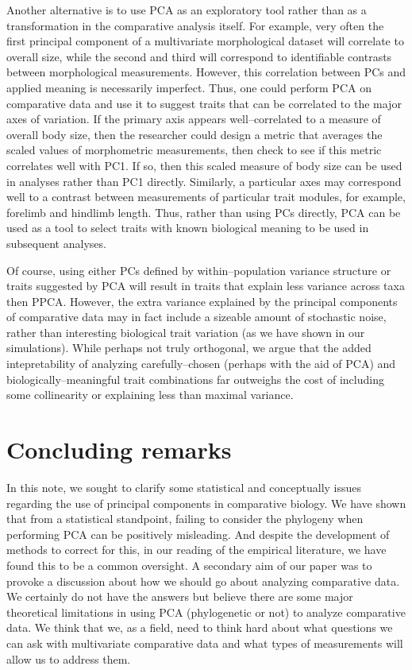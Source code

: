 \documentclass[a4paper,12pt]{article}
\begin{document}
Another alternative is to use PCA as an exploratory tool rather than as a transformation in the comparative analysis itself. For example, very often the first principal component of a multivariate morphological dataset will correlate to overall size, while the second and third will correspond to identifiable contrasts between morphological measurements. However, this correlation between PCs and applied meaning is necessarily imperfect. Thus, one could perform PCA on comparative data and use it to suggest traits that can be correlated to the major axes of variation. If the primary axis appears well--correlated to a measure of overall body size, then the researcher could design a metric that averages the scaled values of morphometric measurements, then check to see if this metric correlates well with PC1. If so, then this scaled measure of body size can be used in analyses rather than PC1 directly. Similarly, a particular axes may correspond well to a contrast between measurements of particular trait modules, for example, forelimb and hindlimb length. Thus, rather than using PCs directly, PCA can be used as a tool to select traits with known biological meaning to be used in subsequent analyses.

Of course, using either PCs defined by within--population variance structure or traits suggested by PCA will result in traits that explain less variance across taxa then PPCA. However, the extra variance explained by the principal components of comparative data may in fact include a sizeable amount of stochastic noise, rather than interesting biological trait variation (as we have shown in our simulations). While perhaps not truly orthogonal, we argue that the added intepretability of analyzing carefully--chosen (perhaps with the aid of PCA) and biologically--meaningful trait combinations far outweighs the cost of including some collinearity or explaining less than maximal variance.

\section{Concluding remarks}
In this note, we sought to clarify some statistical and conceptually issues regarding the use of principal components in comparative biology. We have shown that from a statistical standpoint, failing to consider the phylogeny when performing PCA can be positively misleading. And despite the development of methods to correct for this, in our reading of the empirical literature, we have found this to be a common oversight. A secondary aim of our paper was to provoke a discussion about how we should go about analyzing comparative data. We certainly do not have the answers but believe there are some major theoretical limitations in using PCA (phylogenetic or not) to analyze comparative data. We think that we, as a field, need to think hard about what questions we can ask with multivariate comparative data and what types of measurements will allow us to address them.

\newpage



\end{document}
